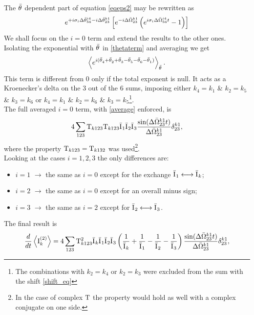 The $\bar{\theta}^{}$ dependent part of equation \eqref{eqeps2} may be rewritten as 
\begin{equation}
    e^{+i\sigma_i\Delta\bar{\theta}^{i4}_{56} -i \Delta\bar{\theta}^{k1}_{23}}\left[e^{-i\Delta\bar{\Omega}^{k1}_{23}}\left(e^{i\sigma_i\Delta\bar{\Omega}^{i4}_{56}t}-1\right)  \right]
    \label{thetaterm}
\end{equation}
We shall focus on the $i=0$ term and extend the results to the other ones. Isolating the exponential with $\bar{\theta}^{}$ in \eqref{thetaterm} and averaging we get
\begin{equation}
    \left\langle e^{i(\bar{\theta}^{}_4 +\bar{\theta}^{}_2 + \bar{\theta}^{}_3 - \bar{\theta}^{}_5 - \bar{\theta}^{}_6 - \bar{\theta}^{}_1)} \right\rangle_{\bar{\theta}^{}}.
    \label{average}
\end{equation} 
This term is different from $0$ only if the total exponent is null. It acts as a Kroenecker's delta on the $3$ out of the $6$ sums, imposing either $k_4=k_1$ \& $k_2 = k_5$ \&
$k_3 = k_6$ or $k_4=k_1$ \& $k_2 = k_6$ \& $k_3 = k_5$\footnote{The combinations with $k_2 = k_4$ or $k_2 = k_3$ were 
excluded from the sum with the shift \eqref{shift_eq}}. \\
The full averaged $i=0$ term, with \eqref{average} enforced, is 
\begin{equation}
    4 \sum_{123} \mathrm{T}_{k123}\mathrm{T}_{k123}\bar{\mathrm{I}^{}}_1\bar{\mathrm{I}^{}}_2\bar{\mathrm{I}^{}}_3\frac{\sin(\Delta\bar{\Omega}^{k1}_{23}t)}{\Delta\bar{\Omega}^{k1}_{23}}\delta^{k1}_{23},
\end{equation}
where the property $\mathrm{T}_{k123} = \mathrm{T}_{k132}$ was used\footnote{In the case of complex $\mathrm{T}$ the property would hold as well with a complex conjugate on one side.}.
\\
Looking at the cases $i =1,2,3$ the only differences are:
\begin{itemize}
    \item $i=1$ $\longrightarrow$ the same as $i=0$ except for the exchange $\bar{\mathrm{I}^{}}_1 \longleftrightarrow \bar{\mathrm{I}^{}}_k$;
    \item $i=2$ $\longrightarrow$ the same as $i=0$ except for an overall minus sign;
    \item $i=3$ $\longrightarrow$ the same as $i=2$ except for  $\bar{\mathrm{I}^{}}_2 \longleftrightarrow \bar{\mathrm{I}^{}}_3$.
\end{itemize}
The final result is
\begin{equation}
    \frac{d}{dt} \left\langle \mathrm{I}^{(2)}_k\right\rangle = 4 \sum_{123} \mathrm{T}^2_{k123}\bar{\mathrm{I}^{}}_k\bar{\mathrm{I}^{}}_1\bar{\mathrm{I}^{}}_2\bar{\mathrm{I}^{}}_3
    \left(\frac{1}{\bar{\mathrm{I}^{}}_k} + \frac{1}{\bar{\mathrm{I}^{}}_1} - \frac{1}{\bar{\mathrm{I}^{}}_2}- \frac{1}{\bar{\mathrm{I}^{}}_3}  \right)
    \frac{\sin(\Delta\bar{\Omega}^{k1}_{23}t)}{\Delta\bar{\Omega}^{k1}_{23}}\delta^{k1}_{23},
    \label{kinetic1}
\end{equation}
